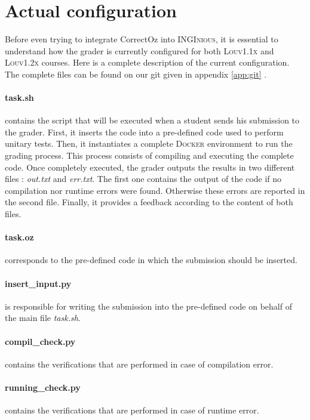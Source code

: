 \documentclass[11pt,a4paper,twoside,openright]{report}
\begin{document}
\section{Actual configuration} \label{sec:current_conf}

Before even trying to integrate CorrectOz into \textsc{INGInious}, it is 
essential to understand how the grader is currently configured for both 
\textsc{Louv1.1x} and \textsc{Louv1.2x} courses. Here is a complete description 
of the current configuration. The complete files can be found on our git given in appendix \ref{app:git} .

\paragraph{task.sh} contains the script that will be executed when a
student sends his submission to the grader. First, it inserts the code into a 
pre-defined code used to perform unitary tests. Then, it instantiates a 
complete \textsc{Docker} environment to run the grading process. This process 
consists of compiling and executing the complete code. Once completely 
executed, the grader outputs the results in two different files : 
\textit{out.txt} and \textit{err.txt}. The first one contains the output of the 
code if no compilation nor runtime errors were found. Otherwise these errors 
are reported in the second file. Finally, it provides a feedback according 
to the content of both files.

\paragraph{task.oz} corresponds to the pre-defined code in which the submission 
should be inserted.

\paragraph{insert\_input.py} is responsible for writing the submission into the 
pre-defined code on behalf of the main file \textit{task.sh}.

\paragraph{compil\_check.py} contains the verifications that are performed in 
case of compilation error.

\paragraph{running\_check.py} contains the verifications that are performed in 
case of runtime error.
\end{document}
